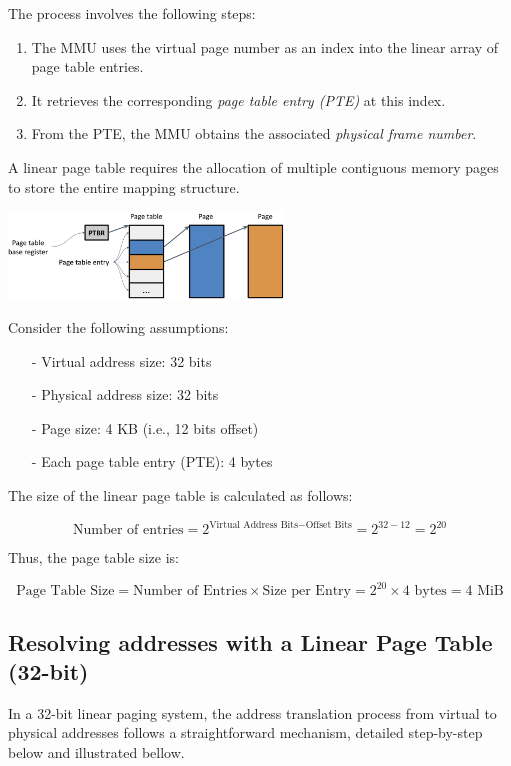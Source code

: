 \documentclass[../../compsys.tex]{subfiles}
\begin{document}
The process involves the following steps:
\begin{enumerate}
    \item The MMU uses the virtual page number as an index into the linear array of page table entries.
    \item It retrieves the corresponding \emph{page table entry (PTE)} at this index.
    \item From the PTE, the MMU obtains the associated \emph{physical frame number}.
\end{enumerate}

A linear page table requires the allocation of multiple contiguous memory pages to store the entire mapping structure.

\begin{center}
  \includegraphics[width=0.55\textwidth]{chapters/L5/images/pte.png}
\end{center}

\begin{example}
Consider the following assumptions:
\begin{itemize}
  \item[-] Virtual address size: 32 bits
  \item[-] Physical address size: 32 bits
  \item[-] Page size: 4 KB (i.e., 12 bits offset)
  \item[-] Each page table entry (PTE): 4 bytes
\end{itemize}

The size of the linear page table is calculated as follows:

\[
\text{Number of entries} = 2^{\text{Virtual Address Bits} - \text{Offset Bits}} = 2^{32 - 12} = 2^{20}
\]

Thus, the page table size is:

\[
\text{Page Table Size} = \text{Number of Entries} \times \text{Size per Entry} = 2^{20} \times 4\text{ bytes} = 4\text{ MiB}
\]
\end{example}
\vfill
\newpage
\subsection{Resolving addresses with a Linear Page Table (32-bit)}
In a 32-bit linear paging system, the address translation process from virtual to physical addresses follows a straightforward mechanism, detailed step-by-step below and illustrated bellow. 
\end{document}
